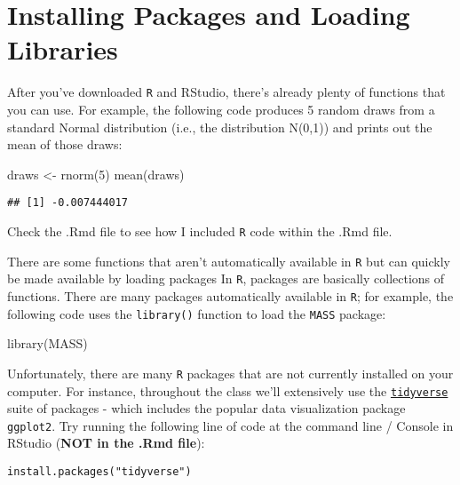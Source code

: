 \documentclass[
]{article}
\newenvironment{Shaded}{\begin{snugshade}}{\end{snugshade}}
\newcommand{\DecValTok}[1]{\textcolor[rgb]{0.00,0.00,0.81}{#1}}
\newcommand{\FunctionTok}[1]{\textcolor[rgb]{0.00,0.00,0.00}{#1}}
\newcommand{\NormalTok}[1]{#1}
\newcommand{\OtherTok}[1]{\textcolor[rgb]{0.56,0.35,0.01}{#1}}
\begin{document}
\hypertarget{installing-packages-and-loading-libraries}{%
\section{Installing Packages and Loading
Libraries}\label{installing-packages-and-loading-libraries}}

After you've downloaded \texttt{R} and RStudio, there's already plenty
of functions that you can use. For example, the following code produces
5 random draws from a standard Normal distribution (i.e., the
distribution N(0,1)) and prints out the mean of those draws:

\begin{Shaded}
\begin{Highlighting}[]
\NormalTok{draws }\OtherTok{\textless{}{-}} \FunctionTok{rnorm}\NormalTok{(}\DecValTok{5}\NormalTok{)}
\FunctionTok{mean}\NormalTok{(draws)}
\end{Highlighting}
\end{Shaded}

\begin{verbatim}
## [1] -0.007444017
\end{verbatim}

Check the .Rmd file to see how I included \texttt{R} code within the
.Rmd file.

There are some functions that aren't automatically available in
\texttt{R} but can quickly be made available by loading packages In
\texttt{R}, packages are basically collections of functions. There are
many packages automatically available in \texttt{R}; for example, the
following code uses the \texttt{library()} function to load the
\texttt{MASS} package:

\begin{Shaded}
\begin{Highlighting}[]
\FunctionTok{library}\NormalTok{(MASS)}
\end{Highlighting}
\end{Shaded}

Unfortunately, there are many \texttt{R} packages that are not currently
installed on your computer. For instance, throughout the class we'll
extensively use the
\href{https://www.tidyverse.org/}{\texttt{tidyverse}} suite of packages
- which includes the popular data visualization package
\texttt{ggplot2}. Try running the following line of code at the command
line / Console in RStudio (\textbf{NOT in the .Rmd file}):

\texttt{install.packages("tidyverse")}
\end{document}
